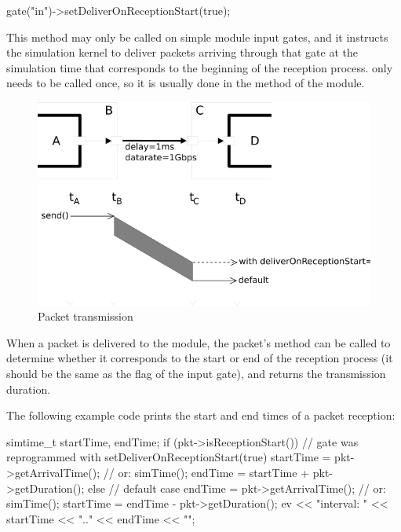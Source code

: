 \begin{cpp}
gate("in")->setDeliverOnReceptionStart(true);
\end{cpp}

This method may only be called on simple module input gates, and it
instructs the simulation kernel to deliver packets arriving through
that gate at the simulation time that corresponds to the
beginning of the reception process.
 only needs to be called once,
so it is usually done in the  method of the module.

\begin{figure}[htbp]
\begin{center}
\includegraphics{figures/transmission}
\caption{Packet transmission}
\label{fig:ch-simple-modules:transmission}
\end{center}
\end{figure}

When a packet is delivered to the module, the packet's
 method can be called to determine
whether it corresponds to the start or end of the reception
process (it should be the same as the 
flag of the input gate), and  returns the transmission
duration.

The following example code prints the start and end times of a packet reception:

\begin{cpp}
simtime_t startTime, endTime;
if (pkt->isReceptionStart())
{
    // gate was reprogrammed with setDeliverOnReceptionStart(true)
    startTime = pkt->getArrivalTime(); // or: simTime();
    endTime = startTime + pkt->getDuration();
}
else
{
    // default case
    endTime = pkt->getArrivalTime(); // or: simTime();
    startTime = endTime - pkt->getDuration();
}
ev << "interval: " << startTime << ".." << endTime << "\n";
\end{cpp}

